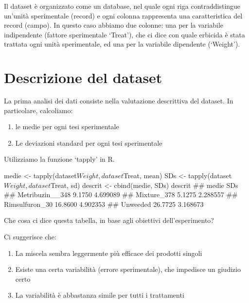 \documentclass[a4paper,12pt,oneside]{book}
\providecommand{\tightlist}{%
  \setlength{\itemsep}{0pt}\setlength{\parskip}{0pt}}
\newenvironment{Shaded}{}{}
\newcommand{\KeywordTok}[1]{#1}
\newcommand{\StringTok}[1]{#1}
\newcommand{\CommentTok}[1]{#1}
\newcommand{\OperatorTok}[1]{#1}
\newcommand{\NormalTok}[1]{#1}
\begin{document}
Il dataset è organizzato come un database, nel quale ogni riga contraddistingue un'unità sperimentale (record) e ogni colonna rappresenta una caratteristica del record (campo). In questo caso abbiamo due colonne: una per la variabile indipendente (fattore sperimentale `Treat'), che ci dice con quale erbicida è stata trattata ogni unità sperimentale, ed una per la variabile dipendente (`Weight').

\hypertarget{descrizione-del-dataset}{%
\section{Descrizione del dataset}\label{descrizione-del-dataset}}

La prima analisi dei dati consiste nella valutazione descrittiva del dataset. In particolare, calcoliamo:

\begin{enumerate}
\def\labelenumi{\arabic{enumi}.}
\tightlist
\item
  le medie per ogni tesi sperimentale
\item
  Le deviazioni standard per ogni tesi sperimentale
\end{enumerate}

Utilizziamo la funzione `tapply' in R.

\begin{Shaded}
\begin{Highlighting}[]
\NormalTok{medie <-}\StringTok{ }\KeywordTok{tapply}\NormalTok{(dataset}\OperatorTok{$}\NormalTok{Weight, dataset}\OperatorTok{$}\NormalTok{Treat, mean)}
\NormalTok{SDs <-}\StringTok{ }\KeywordTok{tapply}\NormalTok{(dataset}\OperatorTok{$}\NormalTok{Weight, dataset}\OperatorTok{$}\NormalTok{Treat, sd)}
\NormalTok{descrit <-}\StringTok{ }\KeywordTok{cbind}\NormalTok{(medie, SDs)}
\NormalTok{descrit}
\CommentTok{##                   medie      SDs}
\CommentTok{## Metribuzin__348  9.1750 4.699089}
\CommentTok{## Mixture_378      5.1275 2.288557}
\CommentTok{## Rimsulfuron_30  16.8600 4.902353}
\CommentTok{## Unweeded        26.7725 3.168673}
\end{Highlighting}
\end{Shaded}

Che cosa ci dice questa tabella, in base agli obiettivi dell'esperimento?

Ci suggerisce che:

\begin{enumerate}
\def\labelenumi{\arabic{enumi}.}
\tightlist
\item
  La miscela sembra leggermente più efficace dei prodotti singoli
\item
  Esiste una certa variabilità (errore sperimentale), che impedisce un giudizio certo
\item
  La variabilità è abbastanza simile per tutti i trattamenti
\end{enumerate}
\end{document}
